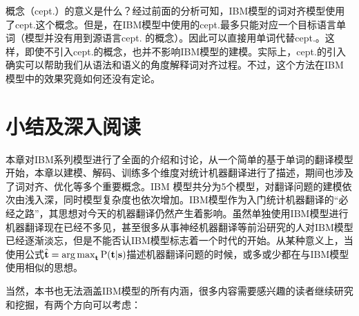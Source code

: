 \parinterval 概念（cept.）的意义是什么？经过前面的分析可知，IBM模型的词对齐模型使用了cept.这个概念。但是，在IBM模型中使用的cept.最多只能对应一个目标语言单词（模型并没有用到源语言cept. 的概念）。因此可以直接用单词代替cept.。这样，即使不引入cept.的概念，也并不影响IBM模型的建模。实际上，cept.的引入确实可以帮助我们从语法和语义的角度解释词对齐过程。不过，这个方法在IBM 模型中的效果究竟如何还没有定论。


\sectionnewpage
\section{小结及深入阅读}

\parinterval 本章对IBM系列模型进行了全面的介绍和讨论，从一个简单的基于单词的翻译模型开始，本章以建模、解码、训练多个维度对统计机器翻译进行了描述，期间也涉及了词对齐、优化等多个重要概念。IBM 模型共分为5个模型，对翻译问题的建模依次由浅入深，同时模型复杂度也依次增加。IBM模型作为入门统计机器翻译的``必经之路''，其思想对今天的机器翻译仍然产生着影响。虽然单独使用IBM模型进行机器翻译现在已经不多见，甚至很多从事神经机器翻译等前沿研究的人对IBM模型已经逐渐淡忘，但是不能否认IBM模型标志着一个时代的开始。从某种意义上，当使用公式$\hat{\mathbf{t}} = \operatorname*{arg\,max}_{\mathbf{t}} \textrm{P}(\mathbf{t}|\mathbf{s})$描述机器翻译问题的时候，或多或少都在与IBM模型使用相似的思想。

\parinterval 当然，本书也无法涵盖IBM模型的所有内涵，很多内容需要感兴趣的读者继续研究和挖掘，有两个方向可以考虑：


